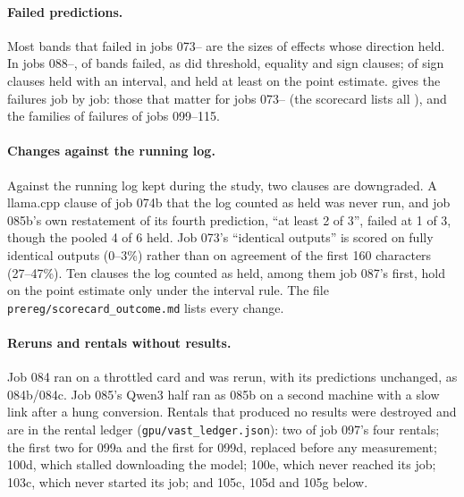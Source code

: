 

\paragraph{Failed predictions.} Most bands that failed in jobs 073--\scLastJob{} are the sizes of effects whose
direction held. In jobs 088--\scLastJob, \scRevFailBand{} of \scRevBandClauses{} bands failed, as did \scRevFailThr{}
threshold, \scRevFailEq{} equality and \scRevFailSign{} sign clauses; \scRevSignHeld{} of \scRevSignClauses{} sign
clauses held with an interval, and \scRevSignHeldAny{} held at least on the point estimate.  gives
the failures job by job: those that matter for jobs 073--\scLastJob{} (the scorecard lists all \scFailed), and the
families of failures of jobs 099--115.

\clearpage   %


\paragraph{Changes against the running log.} Against the running log kept during the study, two clauses are
downgraded. A llama.cpp clause of job 074b that the log counted as held was never run, and job 085b's own restatement
of its fourth prediction, ``at least 2 of 3'', failed at 1 of 3, though the pooled 4 of 6 held. Job 073's ``identical
outputs'' is scored on fully identical outputs (0--3\%) rather than on agreement of the first 160 characters
(27--47\%). Ten clauses the log counted as held, among them job 087's first, hold on the point estimate only under the
interval rule. The file \texttt{prereg/scorecard\_outcome.md} lists every change.

\paragraph{Reruns and rentals without results.} Job 084 ran on a throttled card and was rerun, with its predictions
unchanged, as 084b/084c. Job 085's Qwen3 half ran as 085b on a second machine with a slow link after a hung
conversion. Rentals that produced no results were destroyed and are in the rental ledger
(\texttt{gpu/vast\_ledger.json}): two of job 097's four rentals; the first two for 099a and the first for 099d,
replaced before any measurement; 100d, which stalled downloading the model; 100e, which never reached its job; 103c,
which never started its job; and 105c, 105d and 105g below.

